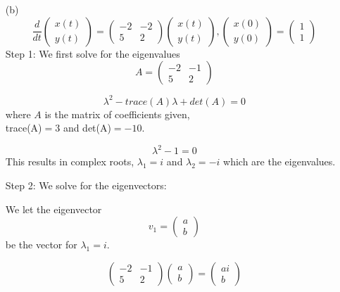 \documentclass[12pt,a4paper]{article}
\begin{document}
\begin{enumerate}
    \item[(b)]
			\begin{equation}
						\frac{d}{dt}   \begin{pmatrix} x(t) \\ y(t) \end{pmatrix} 
									 =  \begin{pmatrix}
											-2 & -2\\
											5 & 2
									\end{pmatrix} \begin{pmatrix} x(t) \\ y(t) \end{pmatrix},  \begin{pmatrix}  x(0) \\ y(0) \end{pmatrix}   =  \begin{pmatrix}  1  \\  1 \end{pmatrix} 
				\label{eq:32}
			\end{equation}
      Step 1: We first solve for the eigenvalues
      \[ 
        A=\begin{pmatrix} -2 & -1 \\ 5 & 2 \end{pmatrix} 
      \]

      \begin{equation}
      \lambda^2 - trace(A)\lambda + det(A)=0  \label{c7}
      \end{equation}
       where $A$  is the matrix of coefficients given,\\
       trace(A)$=3$ and det(A)$=-10$. 

      \begin{equation*}
      \lambda^2 - 1=0  
      \end{equation*}
      This results in complex roots,  $\lambda_1 = i $ and $\lambda_2 = -i $ which are the eigenvalues. 


    Step 2: We solve for the eigenvectors:
    
    We let the eigenvector
    \[ 
      v_1= \begin{pmatrix} a \\ b \end{pmatrix}
    \]
    be the vector for $\lambda_1 = i $.

 
    \[ 
      \begin{pmatrix} -2 & -1 \\ 5 & 2 \end{pmatrix} 
      \begin{pmatrix} a \\ b \end{pmatrix}
      =\begin{pmatrix} ai \\ b \end{pmatrix}
    \]


\end{enumerate}
\end{document}
